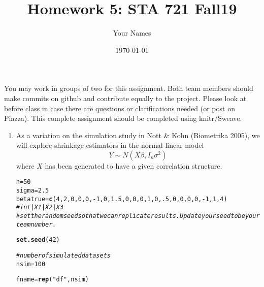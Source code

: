 \documentclass{article}\usepackage[]{graphicx}\usepackage[]{color}
\makeatletter
\newcommand{\hlnum}[1]{\textcolor[rgb]{0.686,0.059,0.569}{#1}}%
\newcommand{\hlstr}[1]{\textcolor[rgb]{0.192,0.494,0.8}{#1}}%
\newcommand{\hlcom}[1]{\textcolor[rgb]{0.678,0.584,0.686}{\textit{#1}}}%
\newcommand{\hlopt}[1]{\textcolor[rgb]{0,0,0}{#1}}%
\newcommand{\hlstd}[1]{\textcolor[rgb]{0.345,0.345,0.345}{#1}}%
\newcommand{\hlkwb}[1]{\textcolor[rgb]{0.69,0.353,0.396}{#1}}%
\newcommand{\hlkwd}[1]{\textcolor[rgb]{0.737,0.353,0.396}{\textbf{#1}}}%
\newenvironment{kframe}{%
 \def\at@end@of@kframe{}%
 \ifinner\ifhmode%
  \def\at@end@of@kframe{\end{minipage}}%
  \begin{minipage}{\columnwidth}%
 \fi\fi%
 \def\FrameCommand##1{\hskip\@totalleftmargin \hskip-\fboxsep
 \colorbox{shadecolor}{##1}\hskip-\fboxsep
     \hskip-\linewidth \hskip-\@totalleftmargin \hskip\columnwidth}%
 \MakeFramed {\advance\hsize-\width
   \@totalleftmargin\z@ \linewidth\hsize
   \@setminipage}}%
 {\par\unskip\endMakeFramed%
 \at@end@of@kframe}
\newenvironment{knitrout}{}{} %
\makeatother
\begin{document}
\title{Homework 5: STA 721 Fall19}
\author{Your Names}
\date{\today}
\maketitle

You may work in groups of two for this assignment.  Both team members should make commits on github and contribute equally to the project. Please look at before class  in case there are questions or clarifications needed (or post on Piazza). This complete assignment should be completed using knitr/Sweave.

\begin{enumerate}
  \item  As a variation on the simulation study in Nott \& Kohn (Biometrika
2005), we will explore shrinkage estimators in the normal linear model
\begin{equation}
  \label{eq:model}
Y \sim N(X \beta, I_n\sigma^2)
\end{equation}
where $X$ has been generated to have a given correlation structure.

\begin{knitrout}
\color{fgcolor}\begin{kframe}
\begin{alltt}
\hlstd{n} \hlkwb{=} \hlnum{50}
\hlstd{sigma} \hlkwb{=} \hlnum{2.5}
\hlstd{betatrue} \hlkwb{=} \hlkwd{c}\hlstd{(}\hlnum{4}\hlstd{,}\hlnum{2}\hlstd{,}\hlnum{0}\hlstd{,}\hlnum{0}\hlstd{,}\hlnum{0}\hlstd{,}\hlopt{-}\hlnum{1}\hlstd{,}\hlnum{0}\hlstd{,}\hlnum{1.5}\hlstd{,} \hlnum{0}\hlstd{,}\hlnum{0}\hlstd{,}\hlnum{0}\hlstd{,}\hlnum{1}\hlstd{,}\hlnum{0}\hlstd{,}\hlnum{.5}\hlstd{,}\hlnum{0}\hlstd{,}\hlnum{0}\hlstd{,}\hlnum{0}\hlstd{,}\hlnum{0}\hlstd{,}\hlopt{-}\hlnum{1}\hlstd{,}\hlnum{1}\hlstd{,}\hlnum{4}\hlstd{)}
\hlcom{#          int|    X1                            | X2     |X3}
\hlcom{# set the random seed so that we can replicate results. Update your seed to be your team number.}

\hlkwd{set.seed}\hlstd{(}\hlnum{42}\hlstd{)}

\hlcom{# number of simulated data sets}
\hlstd{nsim} \hlkwb{=} \hlnum{100}

\hlstd{fname} \hlkwb{=} \hlkwd{rep}\hlstd{(}\hlstr{"df"}\hlstd{, nsim)}


\end{alltt}
\end{kframe}
\end{knitrout}
\end{enumerate}
\end{document}
